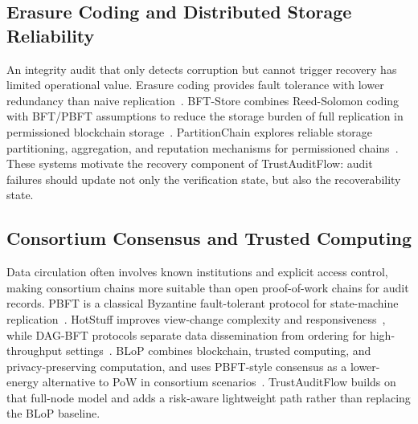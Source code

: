 \subsection{Erasure Coding and Distributed Storage Reliability}

An integrity audit that only detects corruption but cannot trigger recovery has limited operational value. Erasure coding provides fault tolerance with lower redundancy than naive replication~\cite{balaji_erasure_2018}. BFT-Store combines Reed-Solomon coding with BFT/PBFT assumptions to reduce the storage burden of full replication in permissioned blockchain storage~\cite{qi_reliable_2021}. PartitionChain explores reliable storage partitioning, aggregation, and reputation mechanisms for permissioned chains~\cite{du_partitionchain_2023}. These systems motivate the recovery component of TrustAuditFlow: audit failures should update not only the verification state, but also the recoverability state.

\subsection{Consortium Consensus and Trusted Computing}

Data circulation often involves known institutions and explicit access control, making consortium chains more suitable than open proof-of-work chains for audit records. PBFT is a classical Byzantine fault-tolerant protocol for state-machine replication~\cite{castro_practical_2002}. HotStuff improves view-change complexity and responsiveness~\cite{yin_hotstuff_2019}, while DAG-BFT protocols separate data dissemination from ordering for high-throughput settings~\cite{danezis_narwhal_2022,spiegelman_bullshark_2022}. BLoP combines blockchain, trusted computing, and privacy-preserving computation, and uses PBFT-style consensus as a lower-energy alternative to PoW in consortium scenarios~\cite{Zhang2025BloPAT}. TrustAuditFlow builds on that full-node model and adds a risk-aware lightweight path rather than replacing the BLoP baseline.
